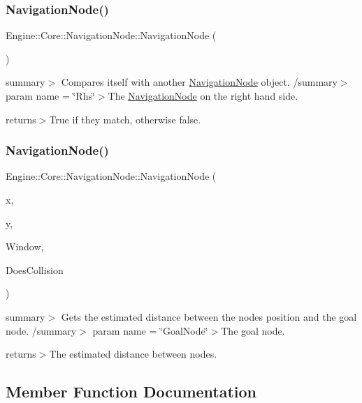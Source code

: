 \subsubsection{\texorpdfstring{Navigation\+Node()}{NavigationNode()}\hspace{0.1cm}{\footnotesize\ttfamily [1/2]}}
{\footnotesize\ttfamily Engine\+::\+Core\+::\+Navigation\+Node\+::\+Navigation\+Node (\begin{DoxyParamCaption}{ }\end{DoxyParamCaption})\hspace{0.3cm}{\ttfamily [default]}}

summary$>$ Compares itself with another \hyperlink{struct_engine_1_1_core_1_1_navigation_node}{Navigation\+Node} object. /summary$>$ param name = \char`\"{}\+Rhs\char`\"{}$>$The \hyperlink{struct_engine_1_1_core_1_1_navigation_node}{Navigation\+Node} on the right hand side.

returns$>$True if they match, otherwise false.\mbox{\label{struct_engine_1_1_core_1_1_navigation_node_a67ff011cd89aced43978f3f6265f6c63}} 
\subsubsection{\texorpdfstring{Navigation\+Node()}{NavigationNode()}\hspace{0.1cm}{\footnotesize\ttfamily [2/2]}}
{\footnotesize\ttfamily Engine\+::\+Core\+::\+Navigation\+Node\+::\+Navigation\+Node (\begin{DoxyParamCaption}\item[{float}]{x,  }\item[{float}]{y,  }\item[{Render\+Window $\ast$}]{Window,  }\item[{bool}]{Does\+Collision }\end{DoxyParamCaption})}

summary$>$ Gets the estimated distance between the nodes position and the goal node. /summary$>$ param name = \char`\"{}\+Goal\+Node\char`\"{}$>$The goal node.

returns$>$The estimated distance between nodes.

\subsection{Member Function Documentation}
\mbox{\label{struct_engine_1_1_core_1_1_navigation_node_a453d05d915929841a1f3d8f228996d37}} 
